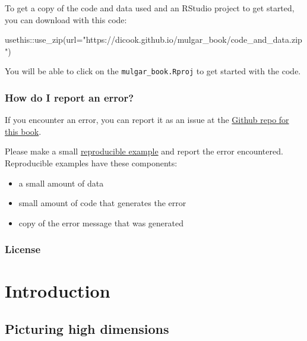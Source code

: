 \documentclass[
  letterpaper,
]{book}
\newenvironment{Shaded}{\begin{snugshade}}{\end{snugshade}}
\newcommand{\AttributeTok}[1]{\textcolor[rgb]{0.40,0.45,0.13}{#1}}
\newcommand{\FunctionTok}[1]{\textcolor[rgb]{0.28,0.35,0.67}{#1}}
\newcommand{\NormalTok}[1]{\textcolor[rgb]{0.00,0.23,0.31}{#1}}
\newcommand{\SpecialCharTok}[1]{\textcolor[rgb]{0.37,0.37,0.37}{#1}}
\newcommand{\StringTok}[1]{\textcolor[rgb]{0.13,0.47,0.30}{#1}}
\providecommand{\tightlist}{%
  \setlength{\itemsep}{0pt}\setlength{\parskip}{0pt}}\usepackage{longtable,booktabs,array}
\begin{document}
To get a copy of the code and data used and an RStudio project to get
started, you can download with this code:

\begin{Shaded}
\begin{Highlighting}[]
\NormalTok{usethis}\SpecialCharTok{::}\FunctionTok{use\_zip}\NormalTok{(}\AttributeTok{url=}\StringTok{"https://dicook.github.io/mulgar\_book/code\_and\_data.zip"}\NormalTok{)}
\end{Highlighting}
\end{Shaded}

You will be able to click on the \texttt{mulgar\_book.Rproj} to get
started with the code.

\hypertarget{how-do-i-report-an-error}{%
\section*{How do I report an error?}\label{how-do-i-report-an-error}}


If you encounter an error, you can report it as an issue at the
\href{https://github.com/dicook/mulgar_book}{Github repo for this book}.

Please make a small \href{https://reprex.tidyverse.org}{reproducible
example} and report the error encountered. Reproducible examples have
these components:

\begin{itemize}
\tightlist
\item
  a small amount of data
\item
  small amount of code that generates the error
\item
  copy of the error message that was generated
\end{itemize}

\hypertarget{license}{%
\section*{License}\label{license}}


\part{Introduction}

\hypertarget{intro}{%
\chapter{Picturing high dimensions}\label{intro}}
\end{document}
